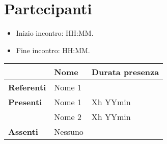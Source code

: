 \section{Partecipanti}

\begin{itemize}
    \item Inizio incontro: HH:MM.
    \item Fine incontro: HH:MM.
\end{itemize}


\begin{center}
{\renewcommand{\arraystretch}{1.5}
\begin{tabular}{l|ll}
	                    & \textbf{Nome} & \textbf{Durata presenza} 	\\
	\hline
	\textbf{Referenti} 	& Nome 1 		&			\\
	\hline
	\textbf{Presenti}   & Nome 1		& Xh YYmin  \\  
						& Nome 2		& Xh YYmin  \\  
	\hline
	\textbf{Assenti}	& Nessuno		&			\\
\end{tabular}	
}
\end{center}